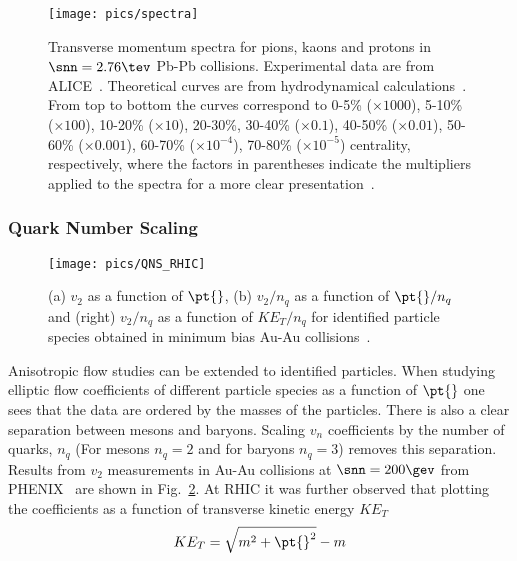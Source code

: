\begin{figure}[htb]
\centering
\texttt{[image: pics/spectra]}
\caption[$\pt{}$ -spectra for pions, kaons and protons]{Transverse momentum spectra for pions, kaons and protons in $\snn=2.76\tev$ Pb-Pb collisions. Experimental data are from ALICE~\cite{Abelev:2013vea}. Theoretical curves are from hydrodynamical calculations~\cite{Song:2013qma}. From top to bottom the curves correspond to 0-5\% ($\times 1000$), 5-10\% ($\times 100$), 10-20\% ($\times 10$), 20-30\%, 30-40\% ($\times0.1$), 40-50\% ($\times 0.01$), 50-60\% ($\times 0.001$), 60-70\% ($ \times 10^{-4}$), 70-80\% ($\times 10^{-5}$) centrality, respectively, where the factors in parentheses indicate the multipliers applied to the spectra for a more clear presentation~\cite{Song:2013qma}.}
\label{fig:dndptpid}
\end{figure}

\subsubsection{Quark Number Scaling}
\begin{figure}[htbp]
	\centering
                \texttt{[image: pics/QNS\_RHIC]}
        \caption[$v_2/n_q$ as a function of $\pt{}/n_q$ and $v_2/n_q$ vs $KE_T/n_q$ at RHIC]{(a) $v_2$ as a function of $\pt{}$, (b) $v_2/n_q$ as a function of $\pt{}/n_q$ and (right) $v_2/n_q$ as a function of $KE_T/n_q$ for identified particle species obtained in minimum bias Au-Au collisions~\cite{Phenix2008}.}
        \label{fig:phenixQNS}
\end{figure}

Anisotropic flow studies can be extended to identified particles. When studying elliptic flow coefficients of different particle species as a function of $\pt{}$ one sees that the data are ordered by the masses of the particles. There is also a clear separation between mesons and baryons. Scaling $v_n$ coefficients by the number of quarks, $n_q$ (For mesons $n_q=2$ and for baryons $n_q=3$) removes this separation. Results from $v_2$ measurements in Au-Au collisions at $\snn=200\gev$ from PHENIX~\cite{Phenix2008} are shown in Fig.~\ref{fig:phenixQNS}. At RHIC it was further observed that plotting the coefficients as a function of transverse kinetic energy $KE_T$
\begin{equation}
KE_T=\sqrt{m^2+\pt{}^2}-m
\label{eq:KET}
\end{equation}


